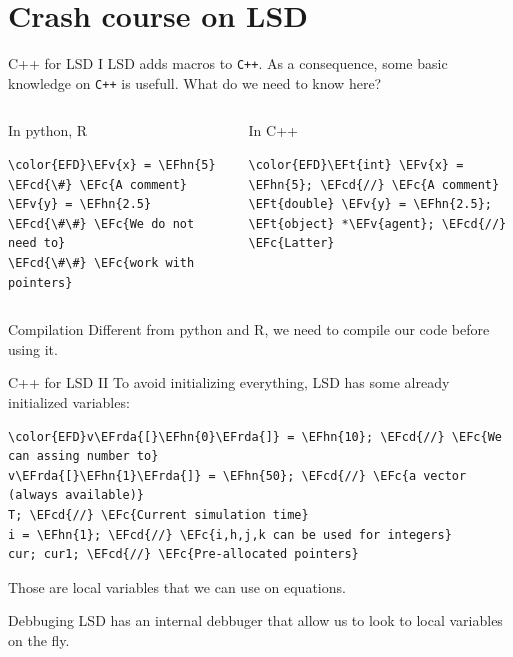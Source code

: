 \documentclass[bigger,aspectratio=169]{beamer}
\newcommand{\EFc}[1]{\textcolor{EFc}{#1}} %
\newcommand{\EFcd}[1]{\textcolor{EFcd}{#1}} %
\newcommand{\EFv}[1]{\textcolor{EFv}{#1}} %
\newcommand{\EFt}[1]{\textcolor{EFt}{#1}} %
\newcommand{\EFhn}[1]{\textcolor{EFhn}{\textbf{#1}}} %
\newcommand{\EFrda}[1]{\textcolor{EFrda}{#1}} %
\begin{document}
\section{Crash course on LSD}
\label{sec:orgc1d5b7f}

\begin{frame}[label={sec:org629004a},fragile]{C++ for LSD I}
 LSD adds macros to \texttt{C++}.
As a consequence, some basic knowledge on \texttt{C++} is usefull.
What do we need to know here?
\begin{columns}
\begin{column}{0.4\columnwidth}
\begin{block}{In python, R}
\begin{Code}
\begin{Verbatim}
\color{EFD}\EFv{x} = \EFhn{5} \EFcd{\#} \EFc{A comment}
\EFv{y} = \EFhn{2.5}
\EFcd{\#\#} \EFc{We do not need to}
\EFcd{\#\#} \EFc{work with pointers}
\end{Verbatim}
\end{Code}
\end{block}
\end{column}
\begin{column}{0.4\columnwidth}
\begin{block}{In C++}
\begin{Code}
\begin{Verbatim}
\color{EFD}\EFt{int} \EFv{x} = \EFhn{5}; \EFcd{//} \EFc{A comment}
\EFt{double} \EFv{y} = \EFhn{2.5};
\EFt{object} *\EFv{agent}; \EFcd{//} \EFc{Latter}
\end{Verbatim}
\end{Code}
\end{block}
\end{column}
\end{columns}
\begin{block}{Compilation}
Different from python and R, we need to \alert{compile} our code before using it.
\end{block}
\end{frame}
\begin{frame}[label={sec:orgd3eafb1},fragile]{C++ for LSD II}
 To avoid initializing everything, LSD has some already initialized variables:

\begin{Code}
\begin{Verbatim}
\color{EFD}v\EFrda{[}\EFhn{0}\EFrda{]} = \EFhn{10}; \EFcd{//} \EFc{We can assing number to}
v\EFrda{[}\EFhn{1}\EFrda{]} = \EFhn{50}; \EFcd{//} \EFc{a vector (always available)}
T; \EFcd{//} \EFc{Current simulation time}
i = \EFhn{1}; \EFcd{//} \EFc{i,h,j,k can be used for integers}
cur; cur1; \EFcd{//} \EFc{Pre-allocated pointers}
\end{Verbatim}
\end{Code}

Those are \alert{local variables} that we can use on equations.
\begin{block}{Debbuging}
LSD has an internal debbuger that allow us to look to local variables on the fly.
\end{block}
\end{frame}
\end{document}
